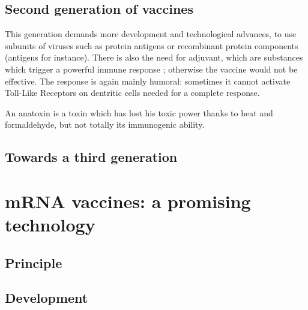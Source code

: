 \documentclass{article}
\begin{document}
        \subsection{Second generation of vaccines}

            This generation demands more development and technological advances,
                to use subunits of viruses such as protein antigens or recombinant protein components (antigens for instance).
            There is also the need for adjuvant, which are substances which trigger a powerful immune response ; otherwise the vaccine would not be effective. 
            The response is again mainly humoral: sometimes it cannot activate Toll-Like Receptors on dentritic cells needed for a complete response.


            An anatoxin is a toxin which has lost his toxic power thanks to heat and formaldehyde, but not totally its immunogenic ability.

        \subsection{Towards a third generation}



    \section{mRNA vaccines: a promising technology}

        \subsection{Principle}

        \subsection{Development}



\end{document}
